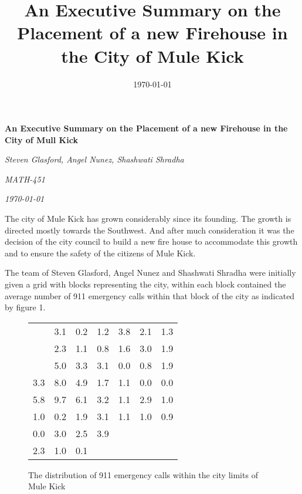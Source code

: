 \documentclass{article}
\title{An Executive Summary on the Placement of a new Firehouse in the City of Mule Kick}
\author{}
\date{\today}
\begin{document}
\begin{center}\textbf{An Executive Summary on the Placement of a new Firehouse in the City of Mull Kick}

\emph{Steven Glasford, Angel Nunez, Shashwati Shradha}

\emph{MATH-451}

\emph{\today}

\end{center}

The city of Mule Kick has grown considerably since its founding. The growth is directed mostly towards the Southwest. And after much consideration it was the decision of the city council to build a new fire house to accommodate this growth and to ensure the safety of the citizens of Mule Kick. 

The team of Steven Glasford, Angel Nunez and Shashwati Shradha were initially given a grid with blocks representing the city, within each block contained the average number of 911 emergency calls within that block of the city as indicated by figure 1.


\begin{figure}[h]
\begin{center}
\begin{tabular}{ c c c c c c c } 
 
 \cline{2-7}
 & \multicolumn{1}{|r}{3.1} & \multicolumn{1}{|r}{0.2} & \multicolumn{1}{|r}{1.2} & \multicolumn{1}{|r}{3.8} & \multicolumn{1}{|r}{2.1} & \multicolumn{1}{|r|}{1.3}\\
 \cline{2-7}
 &\multicolumn{1}{|r}{2.3} & \multicolumn{1}{|r}{1.1} & \multicolumn{1}{|r}{0.8} & \multicolumn{1}{|r}{1.6} & \multicolumn{1}{|r}{3.0} & \multicolumn{1}{|r|}{1.9} \\
 \cline{2-7}
 & \multicolumn{1}{|r}{5.0} & \multicolumn{1}{|r}{3.3} & \multicolumn{1}{|r}{3.1} & \multicolumn{1}{|r}{0.0} & \multicolumn{1}{|r}{0.8} & \multicolumn{1}{|r|}{1.9}\\ 
 \hline
 \multicolumn{1}{|r}{3.3} & \multicolumn{1}{|r}{8.0} & \multicolumn{1}{|r}{4.9} & \multicolumn{1}{|r}{1.7} & \multicolumn{1}{|r}{1.1} & \multicolumn{1}{|r}{0.0} & \multicolumn{1}{|r|}{0.0}\\
 \hline
 \multicolumn{1}{|r}{5.8} & \multicolumn{1}{|r}{9.7} & \multicolumn{1}{|r}{6.1} & \multicolumn{1}{|r}{3.2} & \multicolumn{1}{|r}{1.1} & \multicolumn{1}{|r}{2.9} & \multicolumn{1}{|r|}{1.0}\\
 \hline
 \multicolumn{1}{|r}{1.0} & \multicolumn{1}{|r}{0.2} & \multicolumn{1}{|r}{1.9} & \multicolumn{1}{|r}{3.1} & \multicolumn{1}{|r}{1.1} & \multicolumn{1}{|r}{1.0} & \multicolumn{1}{|r|}{0.9}\\
 \hline
 \multicolumn{1}{|r}{0.0} & \multicolumn{1}{|r}{3.0} & \multicolumn{1}{|r}{2.5} & \multicolumn{1}{|r|}{3.9} &&&\\
 \cline{1-4}
 \multicolumn{1}{|r}{2.3} & \multicolumn{1}{|r}{1.0} & \multicolumn{1}{|r|}{0.1} &&&&\\
 \cline{1-3}
\end{tabular}

\caption{The distribution of 911 emergency calls within the city limits of Mule Kick}
\end{center}
\end{figure}
\end{document}
